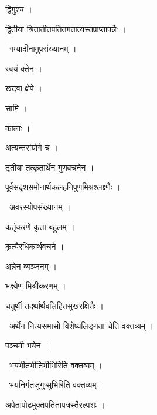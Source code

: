 \documentclass[10pt, openany, oneside]{book}
\begin{document}
\noindent द्विगुश्च ।

\noindent द्वितीया श्रितातीतपतितगतात्यस्तप्राप्तापन्नैः ।

\par\noindent\hspace{1.5em}{\vps वा॰}~{\qt गम्यादीनामुपसंख्यानम् ।}

\noindent स्वयं क्तेन ।

\noindent खट्वा क्षेपे ।

\noindent सामि ।

\noindent कालाः ।

\noindent अत्यन्तसंयोगे च ।

\noindent तृतीया तत्कृतार्थेन गुणवचनेन ।

\noindent पूर्वसदृशसमोनार्थकलहनिपुणमिश्रश्लक्ष्णैः ।

\par\noindent\hspace{1.5em}{\vps वा॰}~{\qt अवरस्योपसंख्यानम् ।}

\noindent कर्तृकरणे कृता बहुलम् ।

\noindent कृत्यैरधिकार्थवचने ।

\noindent अन्नेन व्यञ्जनम् ।

\noindent भक्ष्येण मिश्रीकरणम् ।

\noindent चतुर्थी तदर्थार्थबलिहितसुखरक्षितैः ।

\par\noindent\hspace{1.5em}{\vps वा॰}~{\qt अर्थेन नित्यसमासो विशेष्यलिङ्गता चेति वक्तव्यम् ।}

\noindent पञ्चमी भयेन ।

\par\noindent\hspace{1.5em}{\vps वा॰}~{\qt भयभीतभीतिभीभिरिति वक्तव्यम् ।}

\par\noindent\hspace{1.5em}{\vps वा॰}~{\qt भयनिर्गतजुगुप्सुभिरिति वक्तव्यम् ।}

\noindent अपेतापोढमुक्तपतितापत्रस्तैरल्पशः ।
\end{document}
